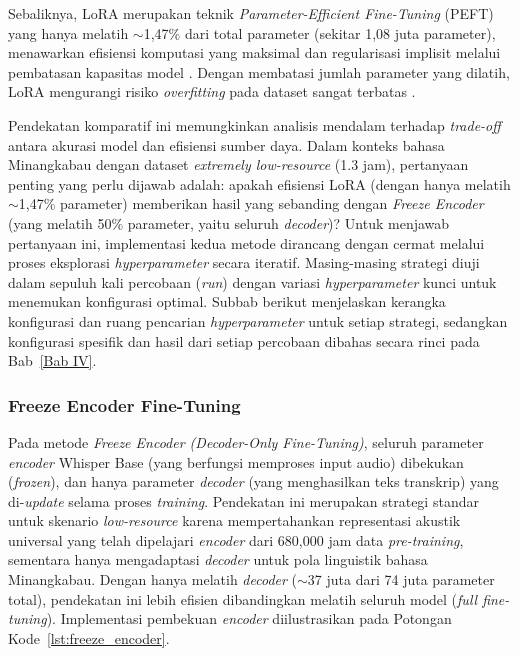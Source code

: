 Sebaliknya, LoRA merupakan teknik \textit{Parameter-Efficient Fine-Tuning} (PEFT) yang hanya melatih $\sim$1,47\% dari total parameter (sekitar 1,08 juta parameter), menawarkan efisiensi komputasi yang maksimal dan regularisasi implisit melalui pembatasan kapasitas model \cite{hu2022lora}. Dengan membatasi jumlah parameter yang dilatih, LoRA mengurangi risiko \textit{overfitting} pada dataset sangat terbatas \cite{song2024lorawhisper}.

Pendekatan komparatif ini memungkinkan analisis mendalam terhadap \textit{trade-off} antara akurasi model dan efisiensi sumber daya. Dalam konteks bahasa Minangkabau dengan dataset \textit{extremely low-resource} (1.3 jam), pertanyaan penting yang perlu dijawab adalah: apakah efisiensi LoRA (dengan hanya melatih $\sim$1,47\% parameter) memberikan hasil yang sebanding dengan \textit{Freeze Encoder} (yang melatih 50\% parameter, yaitu seluruh \textit{decoder})? Untuk menjawab pertanyaan ini, implementasi kedua metode dirancang dengan cermat melalui proses eksplorasi \textit{hyperparameter} secara iteratif. Masing-masing strategi diuji dalam sepuluh kali percobaan (\textit{run}) dengan variasi \textit{hyperparameter} kunci untuk menemukan konfigurasi optimal. Subbab berikut menjelaskan kerangka konfigurasi dan ruang pencarian \textit{hyperparameter} untuk setiap strategi, sedangkan konfigurasi spesifik dan hasil dari setiap percobaan dibahas secara rinci pada Bab~\ref{Bab IV}.

\subsubsection{Freeze Encoder Fine-Tuning}

Pada metode \textit{Freeze Encoder (Decoder-Only Fine-Tuning)}, seluruh parameter \textit{encoder} Whisper Base (yang berfungsi memproses input audio) dibekukan (\textit{frozen}), dan hanya parameter \textit{decoder} (yang menghasilkan teks transkrip) yang di-\textit{update} selama proses \textit{training}. Pendekatan ini merupakan strategi standar untuk skenario \textit{low-resource} karena mempertahankan representasi akustik universal yang telah dipelajari \textit{encoder} dari 680,000 jam data \textit{pre-training}, sementara hanya mengadaptasi \textit{decoder} untuk pola linguistik bahasa Minangkabau. Dengan hanya melatih \textit{decoder} ($\sim$37 juta dari 74 juta parameter total), pendekatan ini lebih efisien dibandingkan melatih seluruh model (\textit{full fine-tuning}). Implementasi pembekuan \textit{encoder} diilustrasikan pada Potongan Kode~\ref{lst:freeze_encoder}.

